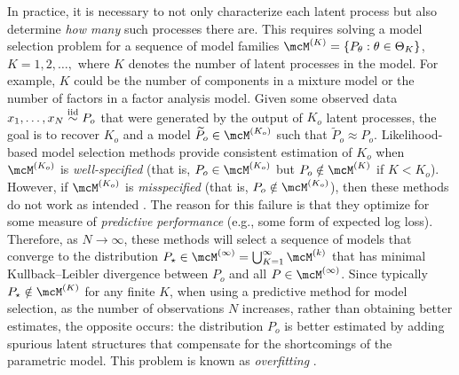 In practice, it is necessary to not only characterize each latent process but also determine \emph{how many} such processes there are.
This requires solving a model selection problem for a sequence of model families $\model{K} = \{ P_\theta : \theta \in \Theta_K\}$, $K = 1, 2, \dots,$ where $K$ denotes the number of latent processes in the model.
For example, $K$ could be the number of components in a mixture model or the number of factors in a factor analysis model.
Given some observed data $x_{1},\dots, x_{N} \stackrel{\text{iid}}{\sim} P_o$ that were generated by the output of $K_{o}$ latent processes,
the goal is to recover $K_{o}$ and a model $\widetilde{P}_o \in \model{K_{o}}$ such that $\widetilde{P}_o  \approx P_{o}$.
Likelihood-based model selection methods provide consistent estimation of $K_o$ when $\model{K_o}$ is \emph{well-specified} (that is, $P_o \in \model{K_o}$ but $P_o \notin \model{K}$ if $K < K_o$).
However, if $\model{K_o}$ is \emph{misspecified} (that is, $P_o \notin \model{K_o}$), then these methods do not work as intended
\citep{Cai:2021,Guha:2021,Fruhwurth:2006,Miller:2019,Xue:2024}.
The reason for this failure is that they optimize for some measure of \emph{predictive performance} (e.g., some form of expected log loss).
Therefore, as $N \to \infty$, these methods will select a sequence of models that converge to the distribution $P_\star
	\in \model{\infty} = \bigcup_{K=1}^\infty \model{k}$ that has minimal Kullback--Leibler divergence between $P_o$ and all $P \in \model{\infty}$.
Since typically $P_\star \notin \model{K}$ for any finite $K$, when using a predictive method for
model selection, as the number of observations $N$ increases, rather than obtaining better estimates, the opposite occurs:
the distribution $P_o$ is better estimated by adding spurious latent structures that compensate for the shortcomings of the parametric model.
This problem is known as \emph{overfitting}  \citep{Cai:2021}. %

